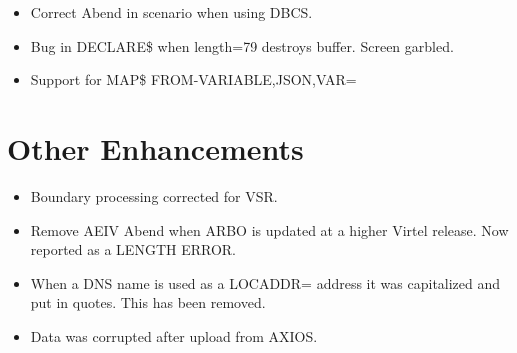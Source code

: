 \documentclass[letterpaper,10pt,english]{sphinxmanual}
\begin{document}
\begin{itemize}
\item {} 
Correct Abend in scenario when using DBCS.

\end{itemize}

\begin{itemize}
\item {} 
Bug in DECLARE\$ when length=79 destroys buffer. Screen garbled.

\end{itemize}

\begin{itemize}
\item {} 
Support for MAP\$ FROM-VARIABLE,JSON,VAR=

\end{itemize}

\newpage


\section{Other Enhancements}
\label{\detokenize{TN202101:other-enhancements}}
\begin{itemize}
\item {} 
Boundary processing corrected for VSR.

\end{itemize}

\begin{itemize}
\item {} 
Remove AEIV Abend when ARBO is updated at a higher Virtel release. Now reported as a LENGTH ERROR.

\end{itemize}

\begin{itemize}
\item {} 
When a DNS name is used as a LOCADDR= address it was capitalized and put in quotes. This has been removed.

\end{itemize}

\begin{itemize}
\item {} 
Data was corrupted after upload from AXIOS.

\end{itemize}
\end{document}
